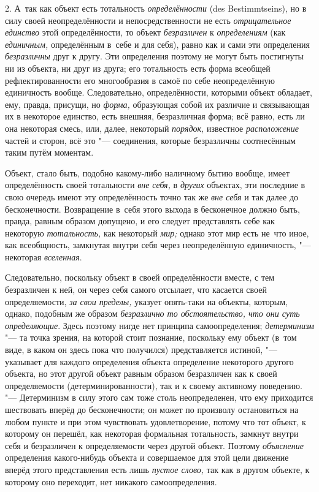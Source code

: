 2. А~так как объект есть тотальность {\em определённости} (des
Bestim\-mtseins), но в силу своей неопределённости и
непосредственности не есть {\em отрицательное единство}
этой определённости, то объект {\em безразличен} к
{\em определениям} (как {\em единичным,}
определённым в~себе и для себя), равно как и сами эти
определения {\em безразличны}
друг к другу. Эти определения поэтому не могут быть
постигнуты ни из объекта, ни друг из друга; его тотальность есть форма
всеобщей рефлектированности его многообразия в самоё по себе неопределённую
единичность вообще. Следовательно, определённости, которыми объект
обладает, ему, правда, присущи, но {\em форма,} образующая
собой их различие и связывающая их в некоторое единство, есть внешняя,
безразличная форма; всё равно, есть ли она некоторая смесь, или, далее,
некоторый {\em порядок,} известное
{\em расположение} частей
и сторон, всё это "--- соединения, которые безразличны
соотнесённым таким путём моментам.

Объект, стало быть, подобно какому-либо наличному бытию
вообще, имеет определённость своей тотальности
{\em вне себя,} в {\em других} объектах,
эти последние в свою очередь имеют эту определённость точно так же
{\em вне себя} и так
далее до бесконечности. Возвращение в~себя этого выхода в бесконечное
должно быть, правда, равным образом допущено, и его следует представлять
себе как некоторую {\em тотальность,} как некоторый {\em мир;}
однако этот мир есть не~что иное, как всеобщность, замкнутая
внутри себя через неопределённую единичность, "--- некоторая {\em вселенная}.

Следовательно, поскольку объект в своей определённости вместе,
с тем безразличен к ней, он через себя самого отсылает, что касается своей
определяемости, {\em за свои пределы,}
указует опять-таки на объекты, которым, однако, подобным же
образом {\em безразлично то
обстоятельство, что они суть определяющие}. Здесь поэтому
нигде нет принципа самоопределения;
{\em детерминизм} "--- та
точка зрения, на которой стоит познание, поскольку ему объект (в~том виде,
в каком он здесь пока что получился) представляется истиной, "---
указывает для каждого определения объекта определение
некоторого другого объекта, но этот другой объект равным образом
безразличен как к своей определяемости (детерминированности), так и к
своему активному поведению. "--- Детерминизм в силу этого сам
тоже столь неопределенен, что ему приходится шествовать вперёд до
бесконечности; он может по произволу остановиться на любом пункте и при
этом чувствовать удовлетворение, потому что тот объект, к которому он
перешёл, как некоторая формальная тотальность, замкнут внутри себя и
безразличен к определяемости через другой объект. Поэтому {\em объяснение}
определения какого-нибудь объекта и совершаемое для этой цели
движение вперёд этого представления есть лишь {\em пустое слово,} так
как в другом объекте, к которому оно переходит, нет никакого самоопределения.

